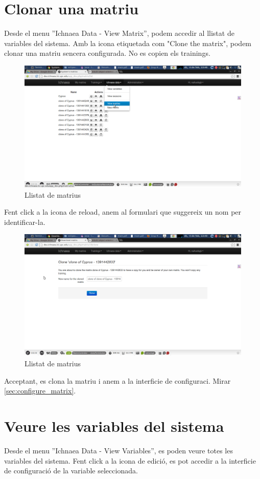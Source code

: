 \section{Clonar una matriu}
\label{sec:clone_matrix}
Desde el menu ''Ichnaea Data - View Matrix'', podem accedir al llistat de variables del sistema. Amb la icona etiquetada com "Clone the matrix", podem clonar una matriu sencera configurada. No es copien els trainings.
\begin{figure}[h!]
  \centering
  \includegraphics[scale=0.2]{img/userguide/clone_matrix.png}
  \caption{Llistat de matrius}
  \label{fig:placement}
\end{figure}
Fent click a la icona de reload, anem al formulari que suggereix un nom per identificar-la.
\begin{figure}[h!]
  \centering
  \includegraphics[scale=0.2]{img/userguide/clone_matrix-2.png}
  \caption{Llistat de matrius}
  \label{fig:placement}
\end{figure}
Acceptant, es clona la matriu i anem a la interficie de configuraci. Mirar \ref{sec:configure_matrix}.

\section{Veure les variables del sistema}
Desde el menu ''Ichnaea  Data - View Variables'', es poden veure totes les variables del sistema. Fent click a la icona de edici\'{o}, es pot accedir a la interficie de configuraci\'{o} de la variable seleccionada.

